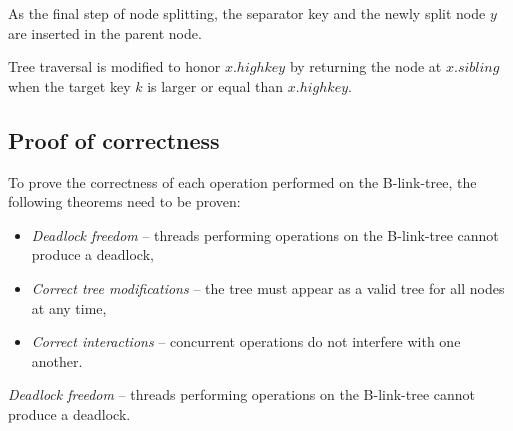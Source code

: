 
As the final step of node splitting, the separator key and the newly split node $y$ are inserted in the parent node.


Tree traversal is modified to honor $x.highkey$ by returning the node at $x.sibling$ when the target key $k$ is larger or equal than $x.highkey$.


\subsection{Proof of correctness}

To prove the correctness of each operation performed on the B-link-tree, the following theorems need to be proven:

\begin{itemize}
  \item \textit{Deadlock freedom} -- threads performing operations on the B-link-tree cannot produce a deadlock,
  \item \textit{Correct tree modifications} -- the tree must appear as a valid tree for all nodes at any time,
  \item \textit{Correct interactions} -- concurrent operations do not interfere with one another.
\end{itemize}

\begin{theorem}
  \textit{Deadlock freedom} -- threads performing operations on the B-link-tree cannot produce a deadlock.
\end{theorem}

